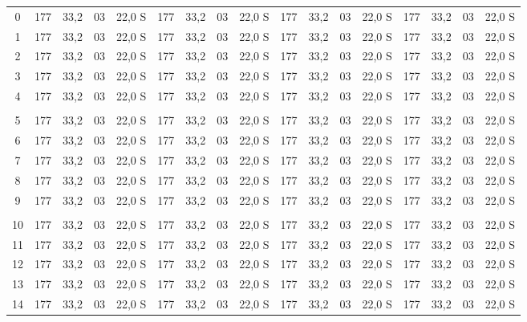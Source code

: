 \documentclass[a4paper]{article}
\begin{document}
\begin{center}
{\begin{tabular}{ c | c c | c c | c c | c c | c c | c c | c c | c c}
    0 & 177 & 33,2 & 03 & 22,0 S & 177 & 33,2 & 03 & 22,0 S & 177 & 33,2 & 03 & 22,0 S & 177 & 33,2 & 03 & 22,0 S\\ 
    1 & 177 & 33,2 & 03 & 22,0 S & 177 & 33,2 & 03 & 22,0 S & 177 & 33,2 & 03 & 22,0 S & 177 & 33,2 & 03 & 22,0 S\\ 
    2 & 177 & 33,2 & 03 & 22,0 S & 177 & 33,2 & 03 & 22,0 S & 177 & 33,2 & 03 & 22,0 S & 177 & 33,2 & 03 & 22,0 S\\ 
    3 & 177 & 33,2 & 03 & 22,0 S & 177 & 33,2 & 03 & 22,0 S & 177 & 33,2 & 03 & 22,0 S & 177 & 33,2 & 03 & 22,0 S\\ 
    4 & 177 & 33,2 & 03 & 22,0 S & 177 & 33,2 & 03 & 22,0 S & 177 & 33,2 & 03 & 22,0 S & 177 & 33,2 & 03 & 22,0 S\\ 
      &     &      &    &        &     &      &    &        &     &      &    &        &     &      &    & \\ 
    5 & 177 & 33,2 & 03 & 22,0 S & 177 & 33,2 & 03 & 22,0 S & 177 & 33,2 & 03 & 22,0 S & 177 & 33,2 & 03 & 22,0 S\\ 
    6 & 177 & 33,2 & 03 & 22,0 S & 177 & 33,2 & 03 & 22,0 S & 177 & 33,2 & 03 & 22,0 S & 177 & 33,2 & 03 & 22,0 S\\ 
    7 & 177 & 33,2 & 03 & 22,0 S & 177 & 33,2 & 03 & 22,0 S & 177 & 33,2 & 03 & 22,0 S & 177 & 33,2 & 03 & 22,0 S\\ 
    8 & 177 & 33,2 & 03 & 22,0 S & 177 & 33,2 & 03 & 22,0 S & 177 & 33,2 & 03 & 22,0 S & 177 & 33,2 & 03 & 22,0 S\\ 
    9 & 177 & 33,2 & 03 & 22,0 S & 177 & 33,2 & 03 & 22,0 S & 177 & 33,2 & 03 & 22,0 S & 177 & 33,2 & 03 & 22,0 S\\ 
    &     &      &    &        &     &      &    &        &     &      &    &        &     &      &    & \\ 
    10 & 177 & 33,2 & 03 & 22,0 S & 177 & 33,2 & 03 & 22,0 S & 177 & 33,2 & 03 & 22,0 S & 177 & 33,2 & 03 & 22,0 S\\ 
    11 & 177 & 33,2 & 03 & 22,0 S & 177 & 33,2 & 03 & 22,0 S & 177 & 33,2 & 03 & 22,0 S & 177 & 33,2 & 03 & 22,0 S\\ 
    12 & 177 & 33,2 & 03 & 22,0 S & 177 & 33,2 & 03 & 22,0 S & 177 & 33,2 & 03 & 22,0 S & 177 & 33,2 & 03 & 22,0 S\\ 
    13 & 177 & 33,2 & 03 & 22,0 S & 177 & 33,2 & 03 & 22,0 S & 177 & 33,2 & 03 & 22,0 S & 177 & 33,2 & 03 & 22,0 S\\ 
    14 & 177 & 33,2 & 03 & 22,0 S & 177 & 33,2 & 03 & 22,0 S & 177 & 33,2 & 03 & 22,0 S & 177 & 33,2 & 03 & 22,0 S\\ 

\end{tabular}}
\end{center}
\end{document}
